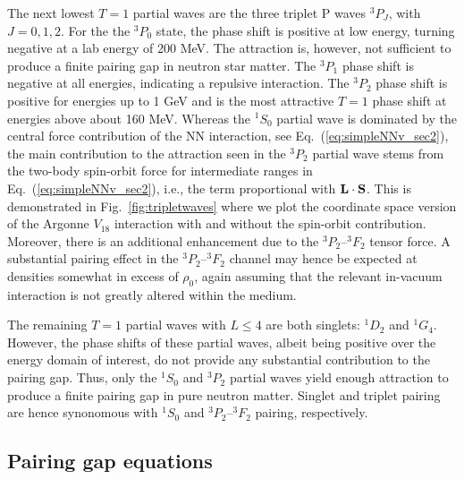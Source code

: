 \documentclass[rmp,aps,floatfix]{revtex4}
\begin{document}
The next lowest $T=1$ partial waves are the three triplet 
P waves $^3P_J$, with $J=0,1,2$.
For the the $^3P_0$ state, the
phase shift is positive  at low energy, turning
negative  at a lab energy of 200 MeV. The attraction is, however,
not sufficient to produce a finite pairing gap
in neutron star matter. The $^3P_1$ phase
shift is negative  at all energies, indicating a repulsive 
interaction.  The
$^3P_2$ phase shift is positive for energies up to 1 GeV and 
is the most attractive $T=1$ phase shift at energies above
about 160 MeV.  
Whereas the $^1S_0$ partial wave is dominated by the central force 
contribution of the NN interaction, see Eq.~(\ref{eq:simpleNNv_sec2}),
the main contribution to the attraction seen in the  
$^3P_2$ partial wave stems from the two-body spin-orbit force
for intermediate ranges
in Eq.~(\ref{eq:simpleNNv_sec2}), i.e., the term proportional with
${\bf L}\cdot {\bf S}$. This is demonstrated in 
Fig.~\ref{fig:tripletwaves} where we plot the coordinate space
version of the Argonne $V_{18}$ interaction \cite{v18} 
with and without the
spin-orbit contribution. Moreover, there is an additional enhancement
due to the $^3P_2$--$^3F_2$ tensor force.  
A substantial pairing effect in the
$^3P_2$--$^3F_2$ channel may hence be expected at densities somewhat 
in excess of $\rho_0$, again assuming that the relevant in-vacuum 
interaction is not greatly altered within the medium.  


The remaining $T=1$ partial waves with $L\leq 4$ are both
singlets: $^1D_2$ and $^1G_4$.  However, the phase shifts of
these partial waves, albeit being positive over the energy domain of interest,
do not provide any substantial contribution to the pairing gap.
Thus, 
only the $^1S_0$ and $^3P_2$ partial waves yield enough attraction
to produce a finite pairing gap in pure neutron matter.
Singlet and triplet pairing are hence synonomous with 
$^1S_0$ and $^3P_2$--$^3F_2$ pairing, respectively.

\subsection{Pairing gap equations}
\end{document}
